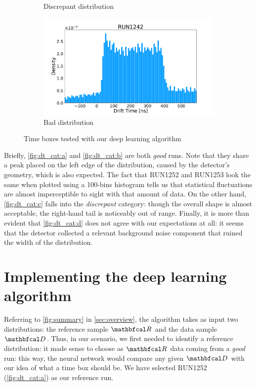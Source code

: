 \begin{figure}[h]
\begin{subfigure}[b]{0.5\textwidth}
        \caption{Discrepant distribution}
        \label{fig:dt_cat:c}
    \end{subfigure}%
    \begin{subfigure}[b]{0.5\textwidth}
        \centering 
        \includegraphics[width=1.0\textwidth]{./Images/experiment/RUN1242.pdf}
        \caption{Bad distribution}
        \label{fig:dt_cat:d}
    \end{subfigure}%
    \caption{Time boxes tested with our deep learning algorithm}
    \label{fig:dt_cat}
\end{figure}

Briefly, \autoref{fig:dt_cat:a} and \autoref{fig:dt_cat:b} are both \textit{good} runs. Note that they share a peak
placed on the left edge of the distribution, caused by the detector's geometry, which is also expected. The fact that
RUN1252 and RUN1253 look the same when plotted using a 100-bins histogram tells us that statistical fluctuations are
almost imperceptible to sight with that amount of data. On the other hand, \autoref{fig:dt_cat:c} falls into the
\textit{discrepant} category: though the overall shape is almost acceptable, the right-hand tail is noticeably out of
range. Finally, it is more than evident that \autoref{fig:dt_cat:d} does not agree with our expectations at all: it
seems that the detector collected a relevant background noise component that ruined the width of the distribution.


\section{Implementing the deep learning algorithm}

Referring to \autoref{fig:summary} in \autoref{sec:overview}, the algorithm takes as input two distributions: the
reference sample $\R$ and the data sample $\D$. Thus, in our scenario, we first needed to identify a reference
distribution: it made sense to choose as $\R$ data coming from a \textit{good} run: this way, the neural network would
compare any given $\D$ with our idea of what a time box should be. We have selected RUN1252 (\autoref{fig:dt_cat:a}) as
our reference run. 

